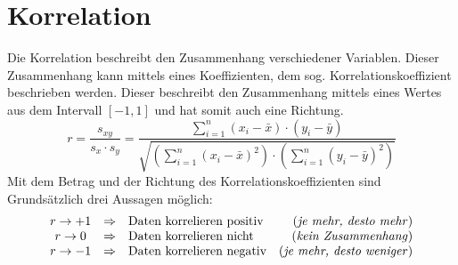 \section{Korrelation}
Die \gls{Korrelation} beschreibt den Zusammenhang verschiedener Variablen.
Dieser Zusammenhang kann mittels eines Koeffizienten, dem sog. 
\gls{Korrelationskoeffizient} beschrieben werden. Dieser beschreibt den
Zusammenhang mittels eines Wertes aus dem Intervall $[-1,1]$ und
hat somit auch eine Richtung.
\[	
	r 
	= \frac{s_{xy}}{s_x \cdot s_y}
	= \frac{\sum\limits_{i=1}^n (x_i-\bar{x}) \cdot (y_i-\bar{y})}{
		\sqrt{\left(\sum\limits_{i=1}^n (x_i-\bar{x})^2\right)
		\cdot \left( \sum\limits_{i=1}^n (y_i-\bar{y})^2\right) }}
\]
Mit dem Betrag und der Richtung des Korrelationskoeffizienten sind 
Grundsätzlich drei Aussagen möglich:
\[ \begin{array}{c c l r}	
	r \rightarrow +1 
		& \Rightarrow 
		& \text{Daten korrelieren positiv} 
		& \text{(\emph{je mehr, desto mehr})} \\
	r \rightarrow 0 
		& \Rightarrow 
		& \text{Daten korrelieren nicht}
		& \text{(\emph{kein Zusammenhang})} \\
	r \rightarrow -1 
		& \Rightarrow 
		& \text{Daten korrelieren negativ}
		& \text{(\emph{je mehr, desto weniger})}
\end{array} \]
